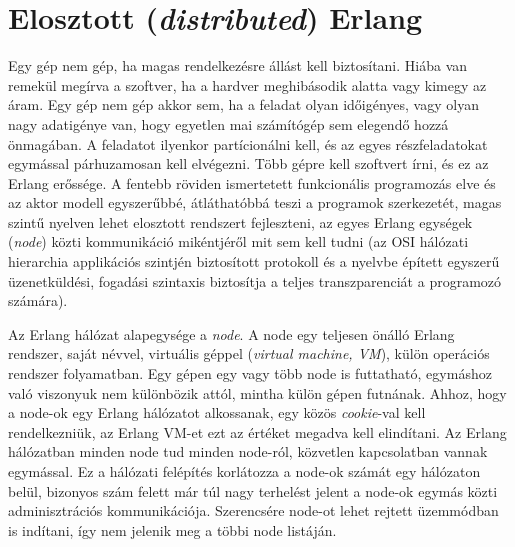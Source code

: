 \documentclass[12pt, a4paper, oneside]{book}
\begin{document}
\section{Elosztott (\emph{distributed}) Erlang}
Egy gép nem gép, ha magas rendelkezésre állást kell biztosítani. Hiába van
remekül megírva a szoftver, ha a hardver meghibásodik alatta vagy kimegy az
áram. Egy gép nem gép akkor sem, ha a feladat olyan időigényes, vagy olyan nagy
adatigénye van, hogy egyetlen mai számítógép sem elegendő hozzá önmagában. A
feladatot ilyenkor partícionálni kell, és az egyes részfeladatokat egymással
párhuzamosan kell elvégezni. Több gépre kell szoftvert írni, és ez az Erlang
erőssége. A fentebb röviden ismertetett funkcionális programozás elve és az
aktor modell egyszerűbbé, átláthatóbbá teszi a programok szerkezetét, magas
szintű nyelven lehet elosztott rendszert fejleszteni, az egyes Erlang egységek
(\emph{node}) közti kommunikáció mikéntjéről mit sem kell tudni (az OSI
hálózati hierarchia applikációs szintjén biztosított protokoll és a nyelvbe
épített egyszerű üzenetküldési, fogadási szintaxis biztosítja a teljes
transzparenciát a programozó számára).

Az Erlang hálózat alapegysége a \emph{node}. A node egy teljesen önálló Erlang
rendszer, saját névvel, virtuális géppel (\emph{virtual machine, VM}), külön
operációs rendszer folyamatban. Egy gépen egy vagy több node is futtatható,
egymáshoz való viszonyuk nem különbözik attól, mintha külön gépen futnának.
Ahhoz, hogy a node-ok egy Erlang hálózatot alkossanak, egy közös
\emph{cookie}-val kell rendelkezniük, az Erlang VM-et ezt az értéket megadva
kell elindítani. Az Erlang hálózatban minden node tud minden node-ról,
közvetlen kapcsolatban vannak egymással. Ez a hálózati felépítés korlátozza a
node-ok számát egy hálózaton belül, bizonyos szám felett már túl nagy terhelést
jelent a node-ok egymás közti adminisztrációs kommunikációja. Szerencsére node-ot lehet
rejtett üzemmódban is indítani, így nem jelenik meg a többi node listáján.
\end{document}
